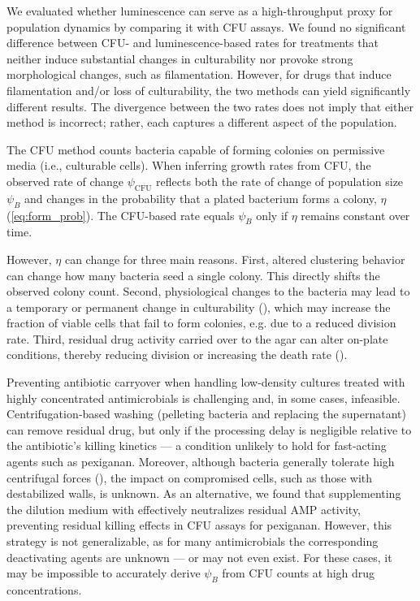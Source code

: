 We evaluated whether luminescence can serve as a high-throughput proxy for population dynamics by comparing it with CFU assays.
We found no significant difference between CFU- and luminescence-based rates for treatments that neither induce substantial changes in culturability nor provoke strong morphological changes, such as filamentation.
However, for drugs that induce filamentation and/or loss of culturability, the two methods can yield significantly different results.
The divergence between the two rates does not imply that either method is incorrect; rather, each captures a different aspect of the population.

The CFU method counts bacteria capable of forming colonies on permissive media (i.e., culturable cells).
When inferring growth rates from CFU, the observed rate of change $\psi_{\mathrm{CFU}}$ reflects both the rate of change of population size $\psi_B$ and changes in the probability that a plated bacterium forms a colony, $\eta$ (\autoref{eq:form_prob}).
The CFU-based rate equals $\psi_B$ only if $\eta$ remains constant over time.

However, \(\eta\) can change for three main reasons.
First, altered clustering behavior can change how many bacteria seed a single colony.
This directly shifts the observed colony count.
Second, physiological changes to the bacteria may lead to a temporary or permanent change in culturability (\cite{Eagle1949, Baquero1986, Besnard2002, Oliver2005, Li2014, Wu2024}), which may increase the fraction of viable cells that fail to form colonies, e.g. due to a reduced division rate.
Third, residual drug activity carried over to the agar can alter on-plate conditions, thereby reducing division or increasing the death rate (\cite{Pearson1980, Eng1991, Coates2018}).

Preventing antibiotic carryover when handling low-density cultures treated with highly concentrated antimicrobials is challenging and, in some cases, infeasible.
Centrifugation‐based washing (pelleting bacteria and replacing the supernatant) can remove residual drug, but only if the processing delay is negligible relative to the antibiotic’s killing kinetics --- a condition unlikely to hold for fast‐acting agents such as pexiganan.
Moreover, although bacteria generally tolerate high centrifugal forces (\cite{Deguchi2011}), the impact on compromised cells, such as those with destabilized walls, is unknown.
As an alternative, we found that supplementing the dilution medium with  effectively neutralizes residual AMP activity, preventing residual killing effects in CFU assays for pexiganan.
However, this strategy is not generalizable, as for many antimicrobials the corresponding deactivating agents are unknown --- or may not even exist.
For these cases, it may be impossible to accurately derive $\psi_B$ from CFU counts at high drug concentrations.

